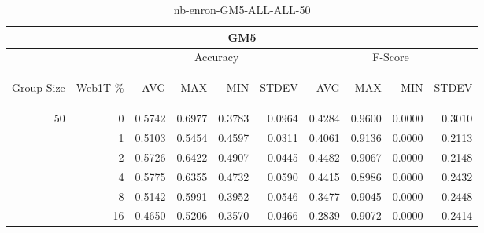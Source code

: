 \begin{center}
\begin{table}[htbp]
\begin{tabular}{ | r | r | r | r | r | r | r | r | r | r |}
\hline
\multicolumn{10}{|c|}{GM5}\\
\hline
 & & \multicolumn{4}{|c|}{Accuracy} & \multicolumn{4}{|c|}{F-Score}\\ \cline{3-10}
\begin{sideways}Group Size\end{sideways} & \begin{sideways}Web1T \%\end{sideways} & \begin{sideways}AVG\end{sideways} & \begin{sideways}MAX\end{sideways} & \begin{sideways}MIN\end{sideways} & \begin{sideways}STDEV\end{sideways} & \begin{sideways}AVG\end{sideways} & \begin{sideways}MAX\end{sideways} & \begin{sideways}MIN\end{sideways} & \begin{sideways}STDEV\end{sideways}\\
\hline
\multirow{5}{*}{50}
 & 0 & 0.5742 & 0.6977 & 0.3783 & 0.0964 & 0.4284 & 0.9600 & 0.0000 & 0.3010\\ \cline{2-10}
 & 1 & 0.5103 & 0.5454 & 0.4597 & 0.0311 & 0.4061 & 0.9136 & 0.0000 & 0.2113\\ \cline{2-10}
 & 2 & 0.5726 & 0.6422 & 0.4907 & 0.0445 & 0.4482 & 0.9067 & 0.0000 & 0.2148\\ \cline{2-10}
 & 4 & 0.5775 & 0.6355 & 0.4732 & 0.0590 & 0.4415 & 0.8986 & 0.0000 & 0.2432\\ \cline{2-10}
 & 8 & 0.5142 & 0.5991 & 0.3952 & 0.0546 & 0.3477 & 0.9045 & 0.0000 & 0.2448\\ \cline{2-10}
 & 16 & 0.4650 & 0.5206 & 0.3570 & 0.0466 & 0.2839 & 0.9072 & 0.0000 & 0.2414\\ \cline{2-10}
\hline
\end{tabular}
\caption{nb-enron-GM5-ALL-ALL-50}
\label{table:nb-enron-GM5-ALL-ALL-50}
\end{table}
\end{center}

